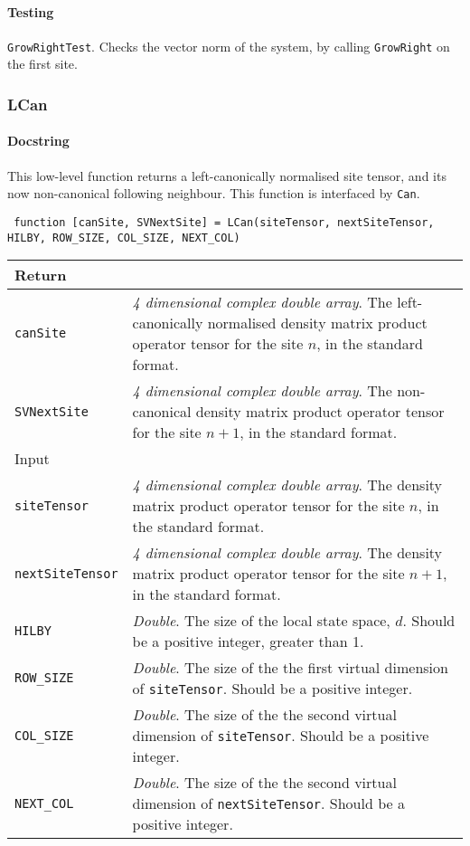  \paragraph{Testing} \lstinline$GrowRightTest$. Checks the vector norm of the system, by calling \lstinline$GrowRight$ on the first site.

 \subsubsection{LCan}
 \paragraph{Docstring} This low-level function returns a left-canonically normalised site tensor, and its now non-canonical following neighbour. This function is interfaced by \lstinline$Can$.  
 \begin{lstlisting}
 function [canSite, SVNextSite] = LCan(siteTensor, nextSiteTensor, HILBY, ROW_SIZE, COL_SIZE, NEXT_COL) \end{lstlisting}
 \begin{longtabu}{X[1,l]X[4,l]}
 \hline
 Return & \\ \hline
 \lstinline$canSite$ & \emph{4 dimensional complex double array}. The left-canonically normalised density matrix product operator tensor for the site \(n\), in the standard format. \\
 \lstinline$SVNextSite$ & \emph{4 dimensional complex double array}. The non-canonical density matrix product operator tensor for the site \(n+1\), in the standard format. \\ \hline
 Input & \\ \hline
 \lstinline$siteTensor$ & \emph{4 dimensional complex double array}. The density matrix product operator tensor for the site \(n\), in the standard format. \\
 \lstinline$nextSiteTensor$ & \emph{4 dimensional complex double array}. The density matrix product operator tensor for the site \(n+1\), in the standard format. \\
 \lstinline$HILBY$ & \emph{Double}. The size of the local state space, \(d\). Should be a positive integer, greater than 1. \\
 \lstinline$ROW_SIZE$ & \emph{Double}. The size of the the first virtual dimension of \lstinline$siteTensor$. Should be a positive integer.  \\
 \lstinline$COL_SIZE$ & \emph{Double}. The size of the the second virtual dimension of \lstinline$siteTensor$. Should be a positive integer. \\
 \lstinline$NEXT_COL$ & \emph{Double}. The size of the the second virtual dimension of \lstinline$nextSiteTensor$. Should be a positive integer. \\
 \hline
 \end{longtabu} 

